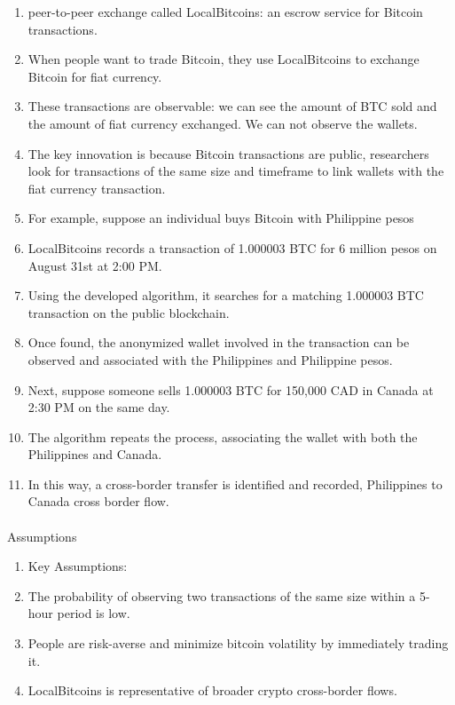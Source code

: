 \documentclass[
  11pt,
]{article}
\makeatletter
\let\oldparagraph\paragraph
\renewcommand{\paragraph}{
    \@ifstar
      \xxxParagraphStar
      \xxxParagraphNoStar
  }
\newcommand{\xxxParagraphStar}[1]{\oldparagraph*{#1}\mbox{}}
\newcommand{\xxxParagraphNoStar}[1]{\oldparagraph{#1}\mbox{}}
\providecommand{\tightlist}{%
  \setlength{\itemsep}{0pt}\setlength{\parskip}{0pt}}\usepackage{longtable,booktabs,array}
\makeatother
\begin{document}
\begin{enumerate}
\def\labelenumi{\arabic{enumi}.}
\tightlist
\item
  peer-to-peer exchange called LocalBitcoins: an escrow service for
  Bitcoin transactions.
\item
  When people want to trade Bitcoin, they use LocalBitcoins to exchange
  Bitcoin for fiat currency.
\item
  These transactions are observable: we can see the amount of BTC sold
  and the amount of fiat currency exchanged. We can not observe the
  wallets.
\item
  The key innovation is because Bitcoin transactions are public,
  researchers look for transactions of the same size and timeframe to
  link wallets with the fiat currency transaction.
\item
  For example, suppose an individual buys Bitcoin with Philippine pesos
\item
  LocalBitcoins records a transaction of 1.000003 BTC for 6 million
  pesos on August 31st at 2:00 PM.
\item
  Using the developed algorithm, it searches for a matching 1.000003 BTC
  transaction on the public blockchain.
\item
  Once found, the anonymized wallet involved in the transaction can be
  observed and associated with the Philippines and Philippine pesos.
\item
  Next, suppose someone sells 1.000003 BTC for 150,000 CAD in Canada at
  2:30 PM on the same day.
\item
  The algorithm repeats the process, associating the wallet with both
  the Philippines and Canada.
\item
  In this way, a cross-border transfer is identified and recorded,
  Philippines to Canada cross border flow.
\end{enumerate}

\paragraph{Assumptions}\label{assumptions-1}

\begin{enumerate}
\def\labelenumi{\arabic{enumi}.}
\setcounter{enumi}{5}
\tightlist
\item
  Key Assumptions:
\item
  The probability of observing two transactions of the same size within
  a 5-hour period is low.
\item
  People are risk-averse and minimize bitcoin volatility by immediately
  trading it.
\item
  LocalBitcoins is representative of broader crypto cross-border flows.
\end{enumerate}
\end{document}
